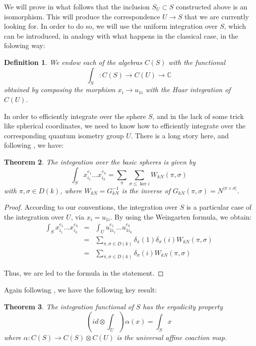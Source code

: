 \documentclass[12pt]{amsbook}
\newtheorem{theorem}{Theorem}[chapter]
\newtheorem{definition}[theorem]{Definition}
\begin{document}
We will prove in what follows that the inclusion $S_U\subset S$ constructed above is an isomorphism. This will produce the correspondence $U\to S$ that we are currently looking for. In order to do so, we will use the uniform integration over $S$, which can be introduced, in analogy with what happens in the classical case, in the folowing way:


\begin{definition}
We endow each of the algebras $C(S)$ with the functional
$$\int_S:C(S)\to C(U)\to\mathbb C$$
obtained by composing the morphism $x_i\to u_{1i}$ with the Haar integration of $C(U)$.
\end{definition}

In order to efficiently integrate over the sphere $S$, and in the lack of some trick like spherical coordinates, we need to know how to efficiently integrate over the corresponding quantum isometry group $U$. There is a long story here, and following \cite{bgo}, we have:

 
\begin{theorem}
The integration over the basic spheres is given by
$$\int_Sx_{i_1}^{e_1}\ldots x_{i_k}^{e_k}=\sum_\pi\sum_{\sigma\leq\ker i}W_{kN}(\pi,\sigma)$$
with $\pi,\sigma\in D(k)$, where $W_{kN}=G_{kN}^{-1}$ is the inverse of $G_{kN}(\pi,\sigma)=N^{|\pi\vee\sigma|}$. 
\end{theorem}

\begin{proof}
According to our conventions, the integration over $S$ is a particular case of the integration over $U$, via $x_i=u_{1i}$. By using the Weingarten formula, we obtain:
\begin{eqnarray*}
\int_Sx_{i_1}^{e_1}\ldots x_{i_k}^{e_k}
&=&\int_Uu_{1i_1}^{e_1}\ldots u_{1i_k}^{e_k}\\
&=&\sum_{\pi,\sigma\in D(k)}\delta_\pi(1)\delta_\sigma(i)W_{kN}(\pi,\sigma)\\
&=&\sum_{\pi,\sigma\in D(k)}\delta_\sigma(i)W_{kN}(\pi,\sigma)
\end{eqnarray*}

Thus, we are led to the formula in the statement.
\end{proof}


Again following \cite{bgo}, we have the following key result:

\begin{theorem}
The integration functional of $S$ has the ergodicity property
$$\left(id\otimes\int_U\right)\alpha(x)=\int_Sx$$
where $\alpha:C(S)\to C(S)\otimes C(U)$ is the universal affine coaction map.
\end{theorem}
\end{document}
